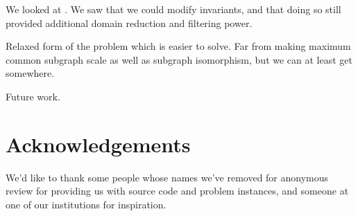 \documentclass[letterpaper]{article}
\theoremstyle{definition}
\begin{document}
We looked at . We saw that we could modify invariants, and that doing so still provided additional
domain reduction and filtering power.

Relaxed form of the problem which is easier to solve. Far from making maximum common subgraph scale
as well as subgraph isomorphism, but we can at least get somewhere.

Future work.

\section*{Acknowledgements}

We'd like to thank some people whose names we've removed for anonymous review for providing us with
source code and problem instances, and someone at one of our institutions for inspiration.



\end{document}
